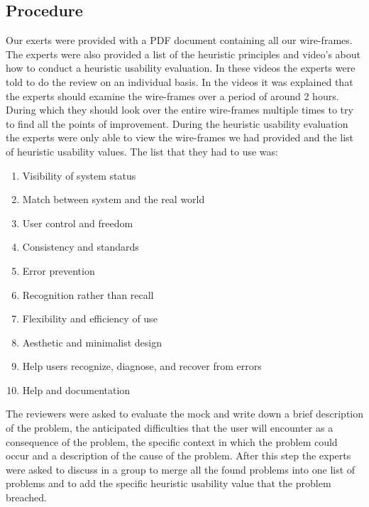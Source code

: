 \subsection{Procedure}
Our exerts were provided with a PDF document containing all our wire-frames. The experts were also provided a list of the heuristic principles and video's about how to conduct a heuristic usability evaluation. In these videos the experts were told to do the review on an individual basis. In the videos it was explained that the experts should examine the wire-frames over a period of around 2 hours. During which they should look over the entire wire-frames multiple times to try to find all the points of improvement. 
During the heuristic usability evaluation the experts were only able to view the wire-frames we had provided and the list of heuristic usability values. The list that they had to use was:\cite{heuristic}
\begin{enumerate}
\item Visibility of system status
\item Match between system and the real world
\item User control and freedom
\item Consistency and standards
\item Error prevention
\item Recognition rather than recall
\item Flexibility and efficiency of use
\item Aesthetic and minimalist design
\item Help users recognize, diagnose, and recover from errors
\item Help and documentation
\end{enumerate}
The reviewers were asked to evaluate the mock and write down a brief description of the problem, the anticipated difficulties that the user will encounter as a consequence of the problem, the specific context in which the problem could occur and a description of the cause of the problem. 
After this step the experts were asked to discuss in a group to merge all the found problems into one list of problems and to add the specific heuristic usability value that the problem breached. 
